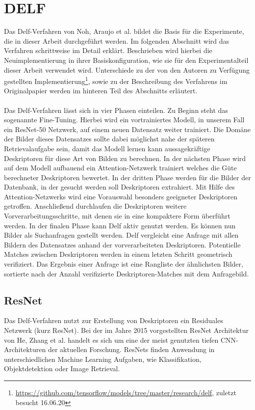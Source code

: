 \chapter{DELF}\label{delf_chapter}
Das Delf-Verfahren \cite{delf} von Noh, \mbox{Araujo} et al. bildet die Basis für die Experimente, die in dieser Arbeit durchgeführt werden. Im folgenden Abschnitt wird das Verfahren schrittweise im Detail erklärt. Beschrieben wird hierbei die Neuimplementierung in ihrer Basiskonfiguration, wie sie für den Experimentalteil dieser Arbeit verwendet wird. Unterschiede zu der von den Autoren zu Verfügung gestellten Implementierung\footnote[1]{\url{https://github.com/tensorflow/models/tree/master/research/delf}, zuletzt besucht 16.06.20}, sowie zu der Beschreibung des Verfahrens im Originalpapier \cite{delf} werden im hinteren Teil des Abschnitts erläutert. 
\\\\
Das Delf-Verfahren lässt sich in vier Phasen einteilen. Zu Beginn steht das sogenannte Fine-Tuning. Hierbei wird ein vortrainiertes Modell, in unserem Fall ein ResNet-50 Netzwerk, auf einem neuen Datensatz weiter trainiert. Die Domäne der Bilder dieses Datensatzes sollte dabei möglichst nahe der späteren Retrievalaufgabe sein, damit das Modell lernen kann aussagekräftige Deskriptoren für diese Art von Bilden zu berechnen. In der nächsten Phase wird auf dem Modell aufbauend ein Attention-Netzwerk trainiert welches die Güte berechneter Deskriptoren bewertet. In der dritten Phase werden für die Bilder der Datenbank, in der gesucht werden soll Deskriptoren extrahiert. Mit Hilfe des Attention-Netzwerks wird eine Vorauswahl besonders geeigneter Deskriptoren getroffen. Anschließend durchlaufen die Deskriptoren weitere Vorverarbeitungsschritte, mit denen sie in eine kompaktere Form überführt werden. In der finalen Phase kann Delf aktiv genutzt werden. Es können nun Bilder als Suchanfragen gestellt werden. Delf vergleicht eine Anfrage mit allen Bildern des Datensatzes anhand der vorverarbeiteten Deskriptoren. Potentielle Matches zwischen Deskriptoren werden in einem letzten Schritt geometrisch verifiziert. Das Ergebnis einer Anfrage ist eine Rangliste der ähnlichsten Bilder, sortierte nach der Anzahl verifizierte Deskriptoren-Matches mit dem Anfragebild.

\section{ResNet}

Das Delf-Verfahren nutzt zur Erstellung von Deskriptoren ein Residuales Netzwerk (kurz ResNet). Bei der im Jahre 2015 vorgestellten ResNet Architektur \cite{resnet} von He, Zhang et al. handelt es sich um eine der meist genutzten tiefen CNN-Architekturen der aktuellen Forschung. ResNets finden Anwendung in unterschiedlichen Machine Learning Aufgaben, wie Klassifikation, Objektdetektion oder Image Retrieval. \\


